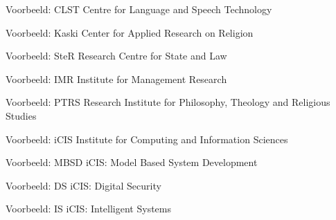\documentclass[department=ds, notes={show notes}, slidesperpage=4, handout, official=true]{beamerruhuisstijl}
\begin{document}
\renewcommand{\dept}{clst}
\begin{frame}
    \titlepage
\end{frame}
\begin{frame}{Voorbeeld: CLST}
	Centre for Language and Speech Technology
\end{frame}

\renewcommand{\dept}{kaski}
\begin{frame}
    \titlepage
\end{frame}
\begin{frame}{Voorbeeld: Kaski}
	Center for Applied Research on Religion
\end{frame}

\renewcommand{\dept}{ster}
\begin{frame}
    \titlepage
\end{frame}
\begin{frame}{Voorbeeld: SteR}
	Research Centre for State and Law
\end{frame}

\renewcommand{\dept}{imr}
\begin{frame}
    \titlepage
\end{frame}
\begin{frame}{Voorbeeld: IMR}
	Institute for Management Research
\end{frame}

\renewcommand{\dept}{ptrs}
\begin{frame}
    \titlepage
\end{frame}
\begin{frame}{Voorbeeld: PTRS}
	Research Institute for Philosophy, Theology and Religious Studies
\end{frame}

\renewcommand{\dept}{icis}
\begin{frame}
    \titlepage
\end{frame}
\begin{frame}{Voorbeeld: iCIS}
	Institute for Computing and Information Sciences
\end{frame}

\renewcommand{\dept}{mbsd}
\begin{frame}
    \titlepage
\end{frame}
\begin{frame}{Voorbeeld: MBSD}
	iCIS: Model Based System Development
\end{frame}

\renewcommand{\dept}{ds}
\begin{frame}
    \titlepage
\end{frame}
\begin{frame}{Voorbeeld: DS}
	iCIS: Digital Security
\end{frame}

\renewcommand{\dept}{is}
\begin{frame}
    \titlepage
\end{frame}
\begin{frame}{Voorbeeld: IS}
	iCIS: Intelligent Systems
\end{frame}
\end{document}
